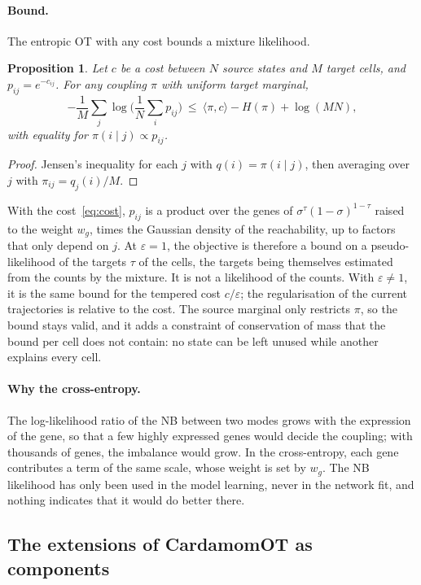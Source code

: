\documentclass[a4paper, 11pt]{article}
\theoremstyle{plain}
\newtheorem{prop}{Proposition}
\theoremstyle{remark}
\begin{document}
\paragraph{Bound.} The entropic OT with any cost bounds a mixture likelihood.

\begin{prop}\label{prop:bound}
Let $c$ be a cost between $N$ source states and $M$ target cells, and $p_{ij} = e^{-c_{ij}}$. For any coupling $\pi$ with uniform target marginal,
\[
-\frac{1}{M}\sum_j \log \Big(\frac{1}{N}\sum_i p_{ij}\Big) \ \le\ \langle \pi, c \rangle - H(\pi) + \log (MN),
\]
with equality for $\pi(i \mid j) \propto p_{ij}$.
\end{prop}

\begin{proof}
Jensen's inequality for each $j$ with $q(i) = \pi(i \mid j)$, then averaging over $j$ with $\pi_{ij} = q_j(i)/M$.
\end{proof}

With the cost~\eqref{eq:cost}, $p_{ij}$ is a product over the genes of $\sigma^{\tau}(1 - \sigma)^{1-\tau}$ raised to the weight $w_g$, times the Gaussian density of the reachability, up to factors that only depend on $j$. At $\varepsilon = 1$, the objective is therefore a bound on a pseudo-likelihood of the targets $\tau$ of the cells, the targets being themselves estimated from the counts by the mixture. It is not a likelihood of the counts. With $\varepsilon \neq 1$, it is the same bound for the tempered cost $c/\varepsilon$; the regularisation of the current trajectories is relative to the cost. The source marginal only restricts $\pi$, so the bound stays valid, and it adds a constraint of conservation of mass that the bound per cell does not contain: no state can be left unused while another explains every cell.

\paragraph{Why the cross-entropy.} The log-likelihood ratio of the NB between two modes grows with the expression of the gene, so that a few highly expressed genes would decide the coupling; with thousands of genes, the imbalance would grow. In the cross-entropy, each gene contributes a term of the same scale, whose weight is set by $w_g$. The NB likelihood has only been used in the model learning, never in the network fit, and nothing indicates that it would do better there.

\subsection{The extensions of CardamomOT as components}\label{sec:extensions}
\end{document}
